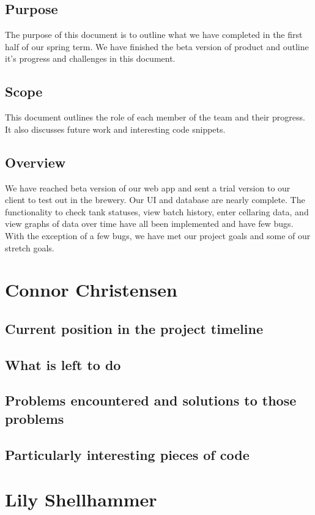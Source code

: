 \documentclass[draftclsnofoot,onecolumn,letterpaper,10pt,compsoc]{IEEEtran}
\begin{document}
\subsection{Purpose}
The purpose of this document is to outline what we have completed in the first half of our spring term.
We have finished the beta version of product and outline it's progress and challenges in this document.
\subsection{Scope}
This document outlines the role of each member of the team and their progress.
It also discusses future work and interesting code snippets.
\subsection{Overview}
We have reached beta version of our web app and sent a trial version to our client to test out in the brewery.
Our UI and database are nearly complete.
The functionality to check tank statuses, view batch history, enter cellaring data, and view graphs of data over time have all been implemented and have few bugs.
With the exception of a few bugs, we have met our project goals and some of our stretch goals.
\section{Connor Christensen}
\subsection{Current position in the project timeline}
\subsection{What is left to do}
\subsection{Problems encountered and solutions to those problems}
\subsection{Particularly interesting pieces of code}


\section{Lily Shellhammer}
\end{document}
